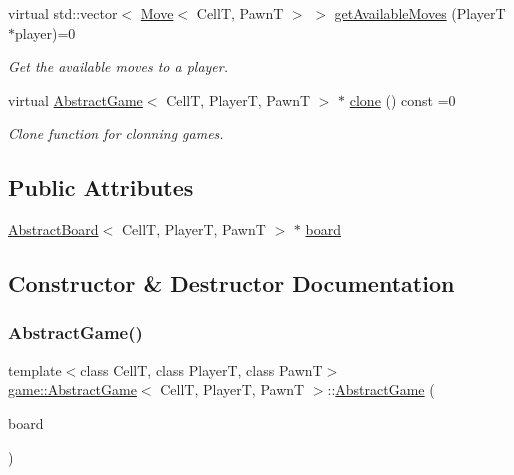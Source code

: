 \begin{DoxyCompactItemize}
virtual std\+::vector$<$ \hyperlink{structgame_1_1_move}{Move}$<$ CellT, PawnT $>$ $>$ \hyperlink{classgame_1_1_abstract_game_a01bbff0af90cc978203726bc7f914a7b}{get\+Available\+Moves} (PlayerT $\ast$player)=0
\begin{DoxyCompactList}\small\item\em Get the available moves to a player. \end{DoxyCompactList}\item 
virtual \hyperlink{classgame_1_1_abstract_game}{Abstract\+Game}$<$ CellT, PlayerT, PawnT $>$ $\ast$ \hyperlink{classgame_1_1_abstract_game_a226baac1f32a8f6672d922675ffddbf6}{clone} () const =0
\begin{DoxyCompactList}\small\item\em Clone function for clonning games. \end{DoxyCompactList}\end{DoxyCompactItemize}
\subsection*{Public Attributes}
\begin{DoxyCompactItemize}
\item 
\hyperlink{classgame_1_1_abstract_board}{Abstract\+Board}$<$ CellT, PlayerT, PawnT $>$ $\ast$ \hyperlink{classgame_1_1_abstract_game_a6df5f611daa1731c4c8d3d5e6289e7e5}{board}
\end{DoxyCompactItemize}


\subsection{Constructor \& Destructor Documentation}
\mbox{\label{classgame_1_1_abstract_game_ae01d0d7523f6958450a404e6aafa5cd0}} 
\subsubsection{\texorpdfstring{Abstract\+Game()}{AbstractGame()}\hspace{0.1cm}{\footnotesize\ttfamily [1/2]}}
{\footnotesize\ttfamily template$<$class CellT, class PlayerT, class PawnT$>$ \\
\hyperlink{classgame_1_1_abstract_game}{game\+::\+Abstract\+Game}$<$ CellT, PlayerT, PawnT $>$\+::\hyperlink{classgame_1_1_abstract_game}{Abstract\+Game} (\begin{DoxyParamCaption}\item[{\hyperlink{classgame_1_1_abstract_board}{Abstract\+Board}$<$ CellT, PlayerT, PawnT $>$ $\ast$}]{board }\end{DoxyParamCaption})\hspace{0.3cm}{\ttfamily [explicit]}}

